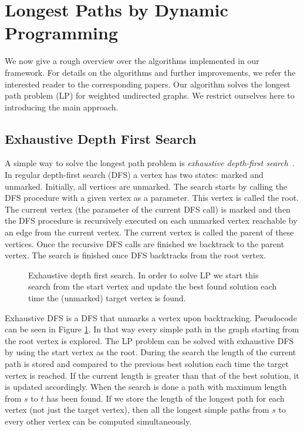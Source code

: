 \documentclass[11pt]{article}
\begin{document}
\section{Longest Paths by Dynamic Programming}
We now give a rough overview over the algorithms implemented in our framework. For details on the algorithms and further improvements, we refer the interested reader to the corresponding papers. 
Our algorithm solves the longest path problem (LP) for weighted undirected graphs. We restrict ourselves here to introducing the main approach.

\subsection{Exhaustive Depth First Search}
\label{sec:approach}
A simple way to solve the longest path problem is \emph{exhaustive depth-first search}~\cite{stern}. 
In regular depth-first search (DFS) a vertex has two states: marked and unmarked. Initially, all vertices are unmarked. The search starts by calling the DFS procedure with a given vertex as a parameter. This
vertex is called the root.
The current vertex (the parameter of the current DFS call) is marked and then the DFS procedure is recursively executed on each unmarked vertex reachable by an edge from the current vertex. The current vertex is called the parent of these vertices. Once the recursive DFS calls are finished we backtrack to the parent vertex. The search is finished once DFS backtracks from the root vertex.
\begin{figure}[b]
\begin{algorithm}[H]
\end{algorithm}
 \caption{Exhaustive depth first search. In order to solve LP we start this search from the start vertex and update the best found solution each time the (unmarked) target vertex is found.}
\label{exDFS}
\end{figure}

Exhaustive DFS is a DFS that unmarks a vertex upon backtracking. Pseudocode can be seen in Figure \ref{exDFS}. In that way every simple path 
in the graph starting from the root vertex is explored. The LP problem can be solved with 
exhaustive DFS by using the start vertex as the root. During the search the 
length of the current path is stored and compared to the previous best 
solution each time the target vertex is reached. If the current length is greater than 
that of the best solution, it is updated accordingly. When the search is done 
a path with maximum length from $s$ to $t$ has been found. If we store the length of the longest path for each vertex (not just the target vertex), then all the longest simple paths from $s$ to every other vertex can be computed simultaneously.
\end{document}
